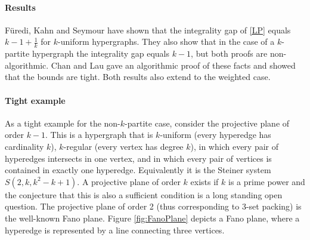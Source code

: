 \paragraph{Results} F\"{u}redi, Kahn and Seymour \cite{Seymour} have shown that the integrality gap of \eqref{LP} equals $k - 1 + \frac{1}{k}$ for $k$-uniform hypergraphs. They also show that in the case of a $k$-partite hypergraph the integrality gap equals $k-1$, but both proofs are non-algorithmic. Chan and Lau \cite{LapChiLau} gave an algorithmic proof of these facts and showed that the bounds are tight. Both results also extend to the weighted case.

\paragraph{Tight example} As a tight example for the non-$k$-partite case, consider the projective plane of order $k-1$. This is a hypergraph that is $k$-uniform (every hyperedge has cardinality $k$), $k$-regular (every vertex has degree $k$), in which every pair of hyperedges intersects in one vertex, and in which every pair of vertices is contained in exactly one hyperedge. Equivalently it is the Steiner system $S(2,k,k^2-k+1)$.
A projective plane of order $k$ exists if $k$ is a prime power and the conjecture that this is also a sufficient condition is a long standing open question. The projective plane of order 2 (thus corresponding to 3-set packing) is the well-known Fano plane. Figure \ref{fig:FanoPlane} depicts a Fano plane, where a hyperedge is represented by a line connecting three vertices.



